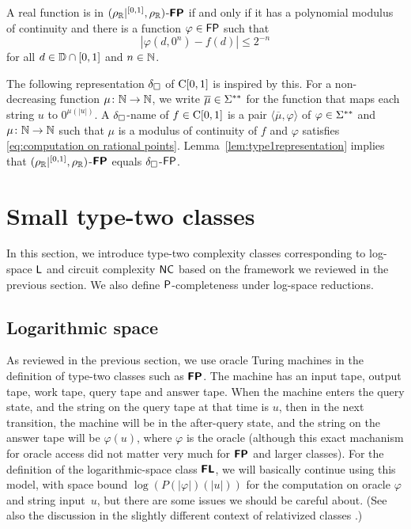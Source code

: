 \documentclass[a4paper,UKenglish]{lipics}
\begin{document}
\begin{lemma}
 \label{lem:type1representation}
 A real function is in $(\rho _\mathbb R|^{[0,1]},\rho _\mathbb R)$-$\text{\bfseries \sffamily \upshape FP}$ if and only if
 it has a polynomial modulus of continuity 
 and there is a function $\varphi \in \mathsf{FP}$ such that 
 \begin{equation}
   \label{eq:computation on rational points}
  |\varphi(d, 0^n) - f(d)| \le 2^{-n} 
 \end{equation}
 for all $d \in \mathbb D \cap [0,1]$ and $n \in \mathbb N$. 
\end{lemma}

The following representation $\delta _\square$ of $\mathrm C[0,1]$ 
is inspired by this. 
For a non-decreasing function $\mu \colon \mathbb N \to \mathbb N$, 
we write $\overline \mu \in \Sigma ^{**}$ for the 
function that maps each string $u$ to $0^{\mu(|u|)}$.
A $\delta _\square$-name of $f \in \mathrm C[0,1]$ is 
a pair $\langle \overline{\mu}, \varphi \rangle$
of $\varphi \in \Sigma ^{**}$ and $\mu \colon \mathbb N \to \mathbb N$
such that 
$\mu$ is a modulus of continuity of $f$
and $\varphi$ satisfies \eqref{eq:computation on rational points}.
Lemma~\ref{lem:type1representation} implies that
$(\rho _\mathbb R|^{[0,1]},\rho _\mathbb R)$-$\text{\bfseries \sffamily \upshape FP}$ equals
$\delta _\square$-$\mathsf{FP}$. 

\section{Small type-two classes}
\label{section:small-classes}

In this section, we introduce type-two complexity classes
corresponding to log-space $\mathsf{L}$ and circuit complexity $\mathsf{NC}$
based on the framework we reviewed in the previous section.
We also define $\mathsf{P}$-completeness under log-space reductions.

\subsection{Logarithmic space}
\label{subsection: logspace}

As reviewed in the previous section, 
we use oracle Turing machines in the definition of type-two classes 
such as $\text{\bfseries \sffamily \upshape FP}$. 
The machine has an input tape, output tape, work tape, query tape and answer tape. 
When the machine enters the query state, 
and the string on the query tape at that time is $u$, 
then in the next transition, 
the machine will be in the after-query state, and 
the string on the answer tape will be $\varphi (u)$, 
where $\varphi$ is the oracle
(although this exact machanism for oracle access did not matter very much
for $\text{\bfseries \sffamily \upshape FP}$ and larger classes). 
For the definition of 
the logarithmic-space class $\text{\bfseries \sffamily \upshape FL}$, 
we will basically continue using this model, 
with space bound $\log (P (\lvert \varphi \rvert) (\lvert u \rvert))$
for the computation on oracle $\varphi$ and string input~$u$, 
but there are some issues we should be careful about. 
(See also the discussion in the slightly different context of relativized classes 
\cite{aehlig2007relativizing,buss1988relativized,ladner1976relativization,wilson1988measure}.)
\end{document}
